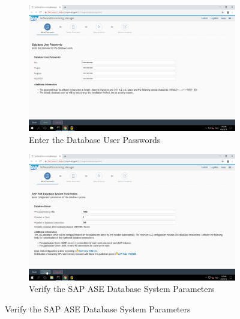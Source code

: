 \begin{figure}[!htb]\ContinuedFloat
    \begin{subfigure}{0.5\textwidth}
        \captionsetup{width=0.8\linewidth}
        \includegraphics[width=0.9\linewidth]{img/Methodologie/SAP18.png}
        \centering
        \caption{Enter the Database User Passwords}
    \end{subfigure}
    \begin{subfigure}{0.5\textwidth}
        \captionsetup{width=0.8\linewidth}
        \includegraphics[width=0.9\linewidth]{img/Methodologie/SAP17.png} 
        \centering
        \caption{Verify the SAP ASE Database System Parameters}
    \end{subfigure}
\end{figure}
